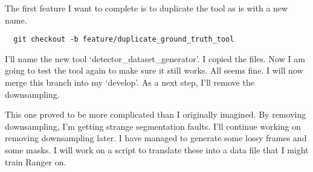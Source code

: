 \documentclass[12pt,oneside]{book}
\begin{document}
The first feature I want to complete is to duplicate the tool as is with a new name.
\begin{lstlisting}
  git checkout -b feature/duplicate_ground_truth_tool\end{lstlisting}

I'll name the new tool `detector\_dataset\_generator'. I copied the files. Now I am going to test the tool again to make sure it still works. All seems fine. I will now merge this branch into my `develop'. As a next step, I'll remove the downsampling.

This one proved to be more complicated than I originally imagined. By removing downsampling, I'm getting strange segmentation faults. I'll continue working on removing downsampling later. I have managed to generate some lossy frames and some masks. I will work on a script to translate these into a data file that I might train Ranger on.






  \printbibliography[title={Bibliografía},heading=bibintoc]
\end{document}
